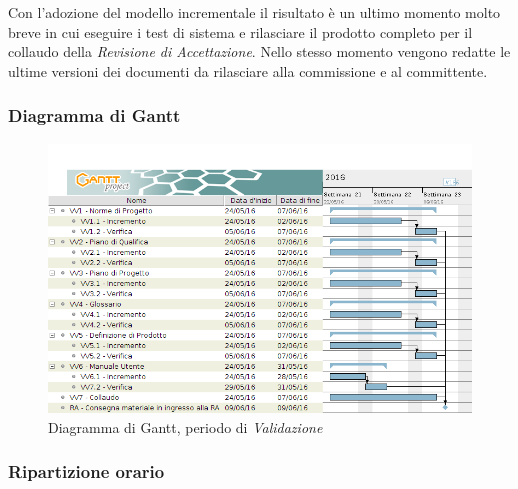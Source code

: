 Con l'adozione del modello incrementale il risultato \`e un ultimo momento molto breve in cui eseguire i test di sistema e rilasciare il prodotto completo per il collaudo della \textit{Revisione di Accettazione}. Nello stesso momento vengono redatte le ultime versioni dei documenti da rilasciare alla commissione e al committente.

\subsubsection{Diagramma di Gantt}
\begin{figure}[ht!]
  \includegraphics[width=1\textwidth]{res/img/pianificazione/VerificaEValidazione.png}
  \caption{Diagramma di Gantt, periodo di \textit{Validazione}}
\end{figure}

\subsubsection{Ripartizione orario}

